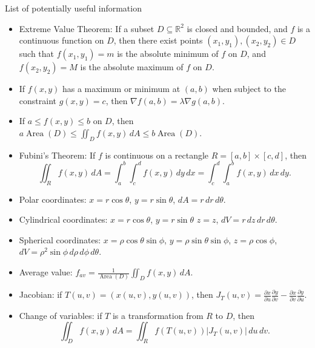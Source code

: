 \documentclass[12pt]{article}
\newcommand{\di}{\displaystyle}
\DeclareMathOperator{\area}{Area}
\begin{document}
\begin{center}
 List of potentially useful information
\end{center}
\begin{itemize}
 \item Extreme Value Theorem: If a subset $D\subseteq \mathbb{R}^2$ is closed and bounded, and $f$ is a continuous function on $D$, then there exist points $(x_1,y_1), (x_2,y_2)\in D$ such that $f(x_1,y_1)=m$ is the absolute minimum of $f$ on $D$, and $f(x_2,y_2)=M$ is the absolute maximum of $f$ on $D$. 
 \item If $f(x,y)$ has a maximum or minimum at $(a,b)$ when subject to the constraint $g(x,y)=c$, then $\nabla f(a,b) = \lambda \nabla g(a,b)$.
 \item If $a\leq f(x,y)\leq b$ on $D$, then $\di a\area(D) \leq \iint_D f(x,y)\, dA\leq b\area(D)$.
 \item Fubini's Theorem: If $f$ is continuous on a rectangle $R=[a,b]\times [c,d]$, then
 \[
 \iint_R f(x,y)\, dA = \int_a^b\int_c^d f(x,y)\,dy\,dx = \int_c^d\int_a^b f(x,y)\,dx\,dy.
 \]
 \item Polar coordinates: $x=r\cos\theta$, $y=r\sin\theta$, $dA = r\,dr\,d\theta$.
 \item Cylindrical coordinates: $x=r\cos\theta$, $y=r\sin\theta$ $z=z$, $dV = r\,dz\,dr\,d\theta$.
 \item Spherical coordinates: $x=\rho\cos\theta\sin\phi$, $y=\rho\sin\theta\sin\phi$, $z=\rho\cos\phi$, $dV = \rho^2\sin\phi\,d\rho\,d\phi\,d\theta$.
 \item Average value: $\di f_{av} = \frac{1}{\area(D)}\iint_D f(x,y)\,dA$.
 \item Jacobian: if $T(u,v) = (x(u,v),y(u,v))$, then $\di J_T(u,v) = \frac{\partial x}{\partial u}\frac{\partial y}{\partial v}-\frac{\partial x}{\partial v}\frac{\partial y}{\partial u}$.
 \item Change of variables: if $T$ is a transformation from $R$ to $D$, then 
\[
 \iint_D f(x,y)\,dA = \iint_R f(T(u,v))\lvert J_T(u,v)\rvert\,du\,dv.
\]


 
\end{itemize}

\newpage
\end{document}
